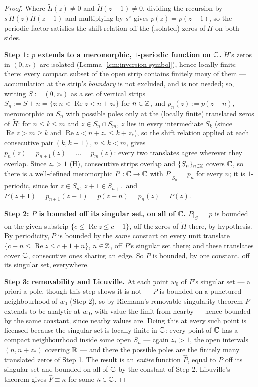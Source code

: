 \begin{proof}
Where $\tilde H(z) \ne 0$ and $\tilde H(z-1) \ne 0$, dividing the recursion by
$s\,\tilde H(z)\tilde H(z-1)$ and multiplying by $s^{z}$ gives $p(z) = p(z-1)$, so the periodic
factor satisfies the shift relation off the (isolated) zeros of $\tilde H$ on both sides.

\textbf{Step 1: $p$ extends to a meromorphic, $1$-periodic function on $\mathbb{C}$.} $\tilde H$'s zeros
in $(0,z_*)$ are isolated (Lemma~\ref{lem:inversion-symbol}), hence locally finite there: every
compact subset of the open strip contains finitely many of them --- accumulation at the strip's
\emph{boundary} is not excluded, and is not needed; so, writing
$S := (0,z_*)$ as a set of vertical strips $S_n := S + n = \{z : n < \operatorname{Re} z < n + z_*\}$ for
$n \in \mathbb{Z}$, and $p_n(z) := p(z-n)$, meromorphic on $S_n$ with possible poles only at the (locally
finite) translated zeros of $\tilde H$: for $n \le k \le m$ and $z \in S_n \cap S_m$,
$z$ lies in every intermediate $S_k$ (since $\operatorname{Re} z > m \ge k$ and $\operatorname{Re} z < n + z_* \le k + z_*$),
so the shift relation applied at each consecutive pair $(k,k+1)$, $n \le k < m$, gives
$p_n(z) = p_{n+1}(z) = \dots = p_m(z)$: every two translates agree wherever they overlap. Since
$z_* > 1$ (H), consecutive strips overlap and $\{S_n\}_{n \in \mathbb{Z}}$ covers $\mathbb{C}$, so there is a
well-defined meromorphic $P : \mathbb{C} \to \mathbb{C}$ with $P|_{S_n} = p_n$ for every $n$; it is $1$-periodic,
since for $z \in S_n$, $z+1 \in S_{n+1}$ and $P(z+1) = p_{n+1}(z+1) = p(z-n) = p_n(z) = P(z)$.

\textbf{Step 2: $P$ is bounded off its singular set, on all of $\mathbb{C}$.} $P|_{S_0} = p$ is bounded on
the given substrip $\{c \le \operatorname{Re} z \le c+1\}$, off the zeros of $\tilde H$ there, by hypothesis. By
periodicity, $P$ is bounded by the \emph{same} constant on every unit translate
$\{c+n \le \operatorname{Re} z \le c+1+n\}$, $n \in \mathbb{Z}$, off $P$'s singular set there; and these translates
cover $\mathbb{C}$, consecutive ones sharing an edge. So $P$ is bounded, by one constant, off its singular
set, everywhere.

\textbf{Step 3: removability and Liouville.} At each point $w_0$ of $P$'s singular set --- a priori
a pole, though this step shows it is not --- $P$ is bounded on a punctured neighbourhood of $w_0$
(Step 2), so by Riemann's removable singularity theorem $P$ extends to be analytic at $w_0$, with
value the limit from nearby --- hence bounded by the same constant, since nearby values are. Doing
this at every such point is licensed because the singular set is locally finite in $\mathbb{C}$: every
point of $\mathbb{C}$ has a compact neighbourhood inside some open $S_n$ --- again $z_* > 1$, the open
intervals $(n, n+z_*)$ covering $\mathbb{R}$ --- and there the possible poles are the finitely many
translated zeros of Step 1. The result is an \emph{entire} function $\hat P$, equal to $P$ off its
singular set and bounded on all of $\mathbb{C}$ by the constant of Step 2. Liouville's theorem gives
$\hat P \equiv \kappa$ for some $\kappa \in \mathbb{C}$.


\end{proof}
